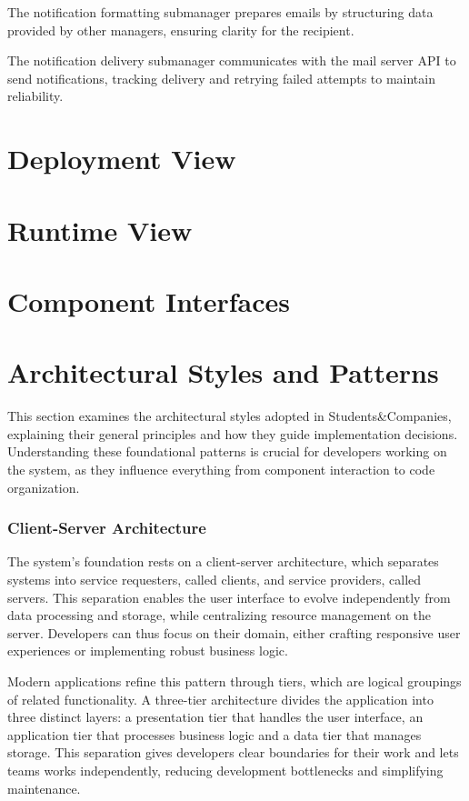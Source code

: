 The notification formatting submanager prepares emails by structuring data provided by other managers, ensuring clarity for the recipient.

The notification delivery submanager communicates with the mail server API to send notifications, tracking delivery and retrying failed attempts to maintain reliability.

\section{Deployment View}
\section{Runtime View}
\section{Component Interfaces}
\section{Architectural Styles and Patterns}
This section examines the architectural styles adopted in Students\&Companies, explaining their general principles and how they guide implementation decisions.
Understanding these foundational patterns is crucial for developers working on the system, as they influence everything from component interaction to code organization.

\subsubsection{Client-Server Architecture}
The system's foundation rests on a client-server architecture, which separates systems into service requesters, called clients, and service providers, called servers.
This separation enables the user interface to evolve independently from data processing and storage, while centralizing resource management on the server.
Developers can thus focus on their domain, either crafting responsive user experiences or implementing robust business logic.

Modern applications refine this pattern through tiers, which are logical groupings of related functionality.
A three-tier architecture divides the application into three distinct layers: a presentation tier that handles the user interface, an application tier that processes business logic and a data tier that manages storage.
This separation gives developers clear boundaries for their work and lets teams works independently, reducing development bottlenecks and simplifying maintenance.

